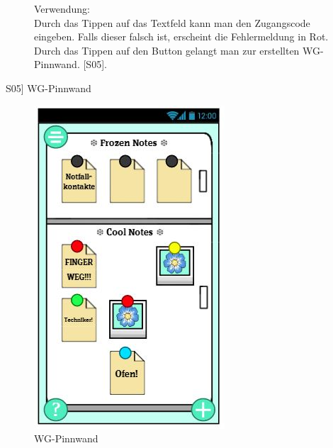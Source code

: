 \documentclass[a4paper]{scrreprt}
\begin{document}
\begin{figure}[h!]
\begin{minipage}[t]{0.55\linewidth}
    			Verwendung:\\
    			Durch das Tippen auf das Textfeld kann man
    			den Zugangscode eingeben. Falls dieser falsch 
    			ist, erscheint die Fehlermeldung in Rot.
    			\\
    			Durch das Tippen auf den Button gelangt man
    			zur erstellten WG-Pinnwand. {[}S05{]}. 
    			
    			
    			
    		\end{minipage}
    	\end{figure}
    
    	\clearpage
    	
    	\hspace{6.3cm}{[}S05{]} WG-Pinnwand \\
    	
    	\begin{figure}
    			\caption{WG-Pinnwand}
    			\includegraphics{fridget_fridge.JPG}
    		
    	\end{figure}
    
    	
    	
\end{document}
